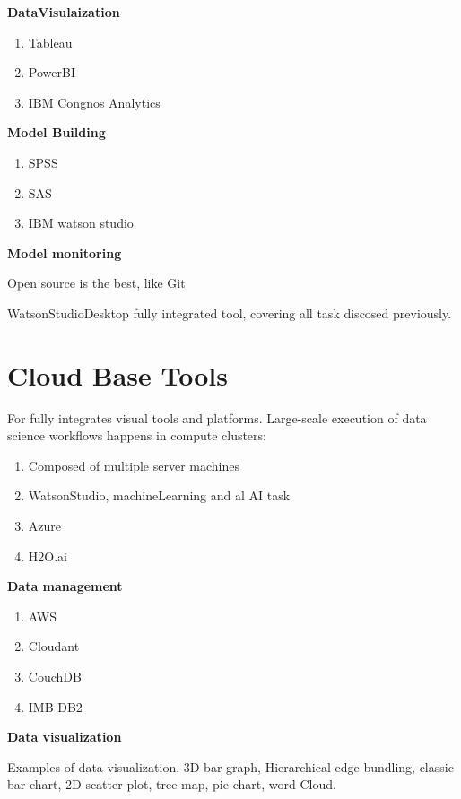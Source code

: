 \documentclass{article}
\begin{document}
\textbf{ DataVisulaization}
\begin{enumerate} 
    \item Tableau
    \item PowerBI
    \item IBM Congnos Analytics 
\end{enumerate}

\textbf{ Model Building}

\begin{enumerate} 
    \item SPSS
    \item SAS
    \item IBM watson studio
\end{enumerate}

\textbf{ Model monitoring}

Open source is the best, like Git


WatsonStudioDesktop fully integrated tool, covering all task discosed previously. 

\section{Cloud Base Tools}

For fully integrates visual tools and platforms. Large-scale execution of data science workflows happens in compute clusters:
\begin{enumerate} 
    \item Composed of multiple server machines
    \item WatsonStudio, machineLearning and al AI task
    \item Azure
    \item H2O.ai
\end{enumerate}
 
\textbf{ Data management}
\begin{enumerate} 
    \item AWS
    \item Cloudant
    \item CouchDB 
    \item IMB DB2
\end{enumerate}




\textbf{ Data visualization}

Examples of data visualization. 3D bar graph, Hierarchical edge bundling, classic bar chart, 2D scatter plot, tree map, pie chart, word Cloud.
\end{document}
